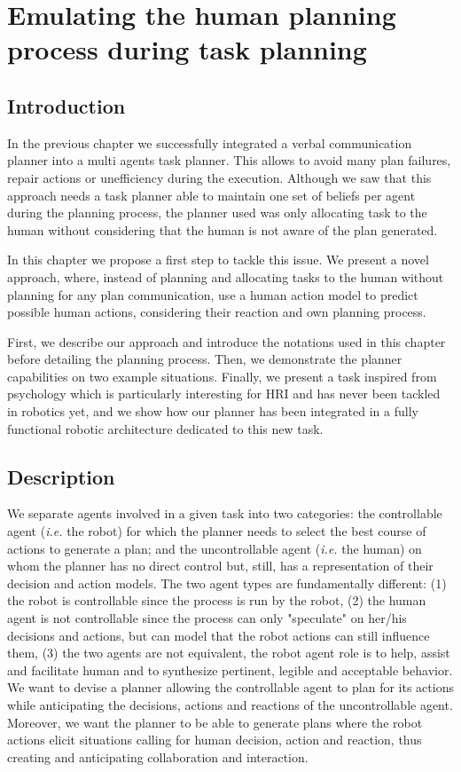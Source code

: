 \documentclass[a4paper,11pt,twoside]{StyleThese}
\begin{document}
\setcounter{chapter}{3} %
\dominitoc
\faketableofcontents
\fi

\chapter{Emulating the human planning process during task planning}
\minitoc

\section{Introduction}
In the previous chapter we successfully integrated a verbal communication planner into a multi agents task planner. This allows to avoid many plan failures, repair actions or unefficiency during the execution. Although we saw that this approach needs a task planner able to maintain one set of beliefs per agent during the planning process, the planner used was only allocating task to the human without considering that the human is not aware of the plan generated.

In this chapter we propose a first step to tackle this issue. We present a novel approach, where, instead of planning and allocating tasks to the human without planning for any plan communication, use a human action model to predict possible human actions, considering their reaction and own planning process.

First, we describe our approach and introduce the notations used in this chapter before detailing the planning process. Then, we demonstrate the planner capabilities on two example situations. Finally, we present a task inspired from psychology which is particularly interesting for HRI and has never been tackled in robotics yet, and we show how our planner has been integrated in a fully functional robotic architecture dedicated to this new task.

\section{Description}
We separate agents involved in a given task into two categories: the controllable agent (\textit{i.e.} the robot) for which the planner needs to select the best course of actions to generate a plan; and the uncontrollable agent (\textit{i.e.} the human) on whom the planner has no direct control but, still, has a representation of their decision and action models. The two agent types are fundamentally different: (1) the robot is controllable since the process is run by the robot, (2) the human agent is not controllable since the process can only "speculate" on her/his decisions and actions, but can model that the robot actions can still influence them, (3) the two agents are not equivalent, the robot agent role is to help, assist and facilitate human and to synthesize pertinent, legible and acceptable behavior.
We want to devise a planner allowing the controllable agent to plan for its actions while anticipating the decisions, actions and reactions of the uncontrollable agent. Moreover, we want the planner to be able to generate plans where the robot actions elicit situations calling for human decision, action and reaction, thus creating and anticipating collaboration and interaction.
\end{document}
